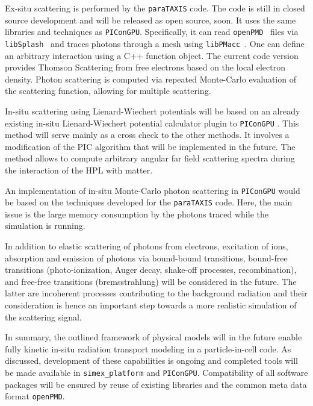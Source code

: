 \documentclass[12pt]{scrartcl}
\begin{document}
Ex-situ scattering is performed by the \texttt{paraTAXIS} code.
The code is still in closed source development and will be released as open source, soon.
It uses the same libraries and
techniques as \texttt{PIConGPU}. Specifically, it can read
\texttt{openPMD}~\cite{openPMD} files via
\texttt{libSplash}~\cite{libSplash_github} and traces photons through a mesh
using \texttt{libPMacc}~\cite{picongpu_github}. One can define an arbitrary
interaction using a C++ function object. The current code version provides
Thomson Scattering from free electrons based on the local electron density.
Photon scattering is computed via repeated Monte-Carlo evaluation of the
scattering function, allowing for multiple scattering.

In-situ scattering using Lienard-Wiechert potentials will be based on an already
existing in-situ Lienard-Wiechert potential calculator plugin to
\texttt{PIConGPU} \cite{Pausch2013}. This method will serve mainly as a cross
check to the other methods. It involves a modification of the PIC algorithm that
will be implemented in the future. The method allows to compute arbitrary
angular far field scattering spectra during the interaction of the HPL with
matter.

An implementation of in-situ Monte-Carlo photon scattering in \texttt{PIConGPU}
would be based on the techniques developed for the \texttt{paraTAXIS} code. Here, the
main issue is the large memory consumption by the photons traced while the
simulation is running.

In addition to elastic scattering of photons from electrons,
excitation of ions, absorption and emission of photons via bound-bound
transitions,
bound-free transitions (photo-ionization, Auger decay, shake-off processes, recombination),
and free-free transitions (bremsstrahlung) will be considered in
the future. The latter are incoherent processes contributing to the background
radiation and their consideration is hence an important step towards a more
realistic simulation of the scattering signal.

In summary, the outlined
framework of physical models will in the future enable fully kinetic in-situ radiation
transport modeling in a particle-in-cell code.
As discussed, development of these capabilities is ongoing and completed tools
will be made available in \texttt{simex\_platform} and \texttt{PIConGPU}.
Compatibility of all software packages will be ensured by reuse of existing
libraries and the common meta data format \texttt{openPMD}.
\end{document}

